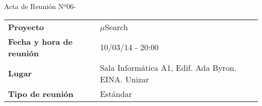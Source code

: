 \begin{center}	
\Large{Acta de Reunión Nº06\hspace{0.25em}-\hspace{0.25em}\tituloReunion}
\end{center}
\vspace{1.5em}

\begin{longtable}{ | L{\tabcolsep} |
				     L{\tabcolsep} | }
\hline %
  \\
\hline %
{\bf Proyecto} & $\mu$Search \\
\hline %
{\bf Fecha y hora de reunión} & 10/03/14 - 20:00 \\
\hline %
{\bf Lugar} & Sala Informática A1, Edif. Ada Byron. EINA. Unizar \\
\hline %
{\bf Tipo de reunión} & Estándar \\
\hline %
\end{longtable}


